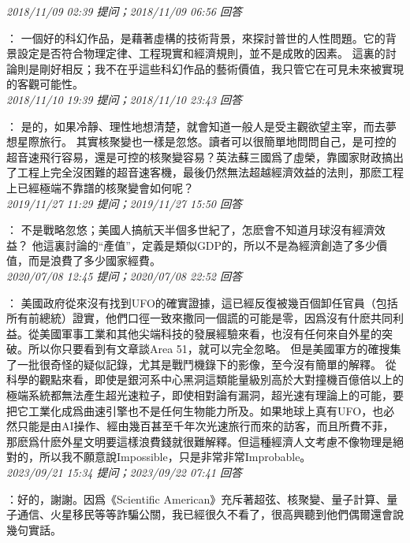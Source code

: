 \documentclass[twocolumn]{ctexart}
\begin{document}
\textit{\hfill\noindent\small 2018/11/09 02:39 提问；2018/11/09 06:56 回答}

：
一個好的科幻作品，是藉著虛構的技術背景，來探討普世的人性問題。它的背景設定是否符合物理定律、工程現實和經濟規則，並不是成敗的因素。
這裏的討論則是剛好相反；我不在乎這些科幻作品的藝術價值，我只管它在可見未來被實現的客觀可能性。
\\

\textit{\hfill\noindent\small 2018/11/10 19:39 提问；2018/11/10 23:43 回答}

：
是的，如果冷靜、理性地想清楚，就會知道一般人是受主觀欲望主宰，而去夢想星際旅行。
其實核聚變也一樣是忽悠。讀者可以很簡單地問問自己，是可控的超音速飛行容易，還是可控的核聚變容易？英法蘇三國爲了虛榮，靠國家財政搞出了工程上完全沒困難的超音速客機，最後仍然無法超越經濟效益的法則，那麽工程上已經極端不靠譜的核聚變會如何呢？
\\

\textit{\hfill\noindent\small 2019/11/27 11:29 提问；2019/11/27 15:50 回答}

：
不是戰略忽悠；美國人搞航天半個多世紀了，怎麽會不知道月球沒有經濟效益？
他這裏討論的“產值”，定義是類似GDP的，所以不是為經濟創造了多少價值，而是浪費了多少國家經費。
\\

\textit{\hfill\noindent\small 2020/07/08 12:45 提问；2020/07/08 22:52 回答}

：
美國政府從來沒有找到UFO的確實證據，這已經反復被幾百個卸任官員（包括所有前總統）證實，他們口徑一致來撒同一個謊的可能是零，因爲沒有什麽共同利益。從美國軍事工業和其他尖端科技的發展經驗來看，也沒有任何來自外星的突破。所以你只要看到有文章談Area 51，就可以完全忽略。
但是美國軍方的確搜集了一批很奇怪的疑似記錄，尤其是戰鬥機錄下的影像，至今沒有簡單的解釋。
從科學的觀點來看，即使是銀河系中心黑洞這類能量級別高於大對撞機百億倍以上的極端系統都無法產生超光速粒子，即使相對論有漏洞，超光速有理論上的可能，要把它工業化成爲曲速引擎也不是任何生物能力所及。如果地球上真有UFO，也必然只能是由AI操作、經由幾百甚至千年次光速旅行而來的訪客，而且所費不菲，那麽爲什麽外星文明要這樣浪費錢就很難解釋。但這種經濟人文考慮不像物理是絕對的，所以我不願意說Impossible，只是非常非常Improbable。
\\

\textit{\hfill\noindent\small 2023/09/21 15:34 提问；2023/09/22 07:41 回答}

：好的，謝謝。因爲《Scientific American》充斥著超弦、核聚變、量子計算、量子通信、火星移民等等詐騙公關，我已經很久不看了，很高興聽到他們偶爾還會說幾句實話。
\\
\end{document}
